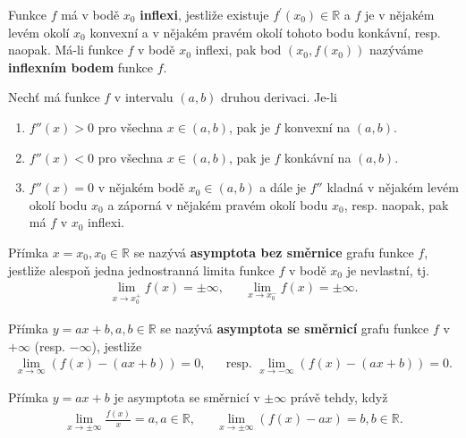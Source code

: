 \begin{definition}
Funkce $f$ má v bodě $x_0$ \textbf{inflexi}, jestliže existuje $f^\prime(x_0) \in
\mathbb R$ a $f$ je v nějakém levém okolí $x_0$ konvexní a v nějakém pravém okolí
tohoto bodu konkávní, resp. naopak. Má-li funkce $f$ v bodě $x_0$ inflexi, pak bod
$(x_0, f(x_0))$ nazýváme \textbf{inflexním bodem} funkce $f$.
\end{definition}

\begin{veta}
Nechť má funkce $f$ v intervalu $(a,b)$ druhou derivaci. Je-li
\begin{enumerate}[$i.$]
\item $f'' (x)>0$ pro všechna $x \in (a,b)$, pak je $f$
konvexní na $(a,b)$.
\item $f''(x)<0$ pro všechna $x \in (a,b)$, pak je $f$
konkávní na $(a,b)$.
\item $f''(x)=0$ v nějakém bodě $x_0\in(a,b)$ a dále je $f''$
kladná v nějakém levém okolí bodu $x_0$ a záporná v nějakém pravém okolí bodu $x_0$,
resp. naopak, pak má $f$ v $x_0$ inflexi.
\end{enumerate}
\end{veta}

\begin{definition}
Přímka $x=x_0,x_0\in \mathbb R$ se nazývá \textbf{asymptota bez směrnice}
grafu funkce $f$, jestliže alespoň jedna jednostranná limita funkce $f$
v bodě $x_0$ je nevlastní, tj.
\begin{align*}
    \lim_{x\to x_0^+} f(x) = \pm\infty, & & \lim_{x\to x_0^-} f(x)=\pm\infty.
\end{align*}
\end{definition}

\begin{definition}
Přímka $y=ax+b, a,b\in \mathbb R$ se nazývá \textbf{asymptota se směrnicí} grafu
funkce $f$ v $+\infty$ (resp. $-\infty$), jestliže
\begin{align*}
    \lim_{x\to\infty}(f(x)-(ax+b))=0, & & \textrm{resp. }\lim_{x\to-\infty}(f(x)-(ax+b))=0.
\end{align*}
\end{definition}

\begin{veta}
    Přímka $y=ax+b$ je asymptota se směrnicí v $\pm\infty$ právě tehdy, když
    \begin{align*}
        \lim_{x\to\pm\infty}\frac{f(x)}{x}=a, a\in \mathbb R, & & \lim_{x\to\pm\infty}(f(x)-ax)=b,b \in \mathbb R.
    \end{align*}
\end{veta}

